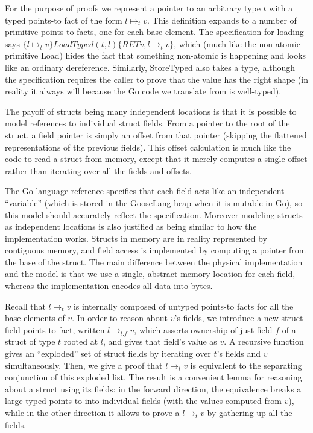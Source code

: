 For the purpose of proofs we represent a pointer to an arbitrary type
$t$ with a typed points-to fact of the form $l \mapsto_t v$. This
definition expands to a number of primitive points-to facts, one for
each base element. The specification for loading says
$\{l \mapsto_t v\} LoadTyped(t, l) \{RET v, l \mapsto_t v\}$, which
(much like the non-atomic primitive Load) hides the fact that something
non-atomic is happening and looks like an ordinary dereference.
Similarly, StoreTyped also takes a type, although the specification
requires the caller to prove that the value has the right shape (in
reality it always will because the Go code we translate from is
well-typed).

The payoff of structs being many independent locations is that it is
possible to model references to individual struct fields. From a pointer
to the root of the struct, a field pointer is simply an offset from that
pointer (skipping the flattened representations of the previous fields).
This offset calculation is much like the code to read a struct from
memory, except that it merely computes a single offset rather than
iterating over all the fields and offsets.

The Go language reference specifies that each field acts like an
independent ``variable'' (which is stored in the GooseLang heap when it
is mutable in Go), so this model should accurately reflect the
specification. Moreover modeling structs as independent locations is
also justified as being similar to how the implementation works. Structs
in memory are in reality represented by contiguous memory, and field
access is implemented by computing a pointer from the base of the
struct. The main difference between the physical implementation and the
model is that we use a single, abstract memory location for each field,
whereas the implementation encodes all data into bytes.

Recall that $l \mapsto_t v$ is internally composed of untyped
points-to facts for all the base elements of $v$. In order to reason
about $v$'s fields, we introduce a new struct field points-to fact,
written $l \mapsto_{t.f} v$, which asserts ownership of just field
$f$ of a struct of type $t$ rooted at $l$, and gives that field's
value as $v$. A recursive function gives an ``exploded'' set of struct
fields by iterating over $t$'s fields and $v$ simultaneously. Then,
we give a proof that $l \mapsto_t v$ is equivalent to the separating
conjunction of this exploded list. The result is a convenient lemma for
reasoning about a struct using its fields: in the forward direction, the
equivalence breaks a large typed points-to into individual fields (with
the values computed from $v$), while in the other direction it allows
to prove a $l \mapsto_t v$ by gathering up all the fields.

